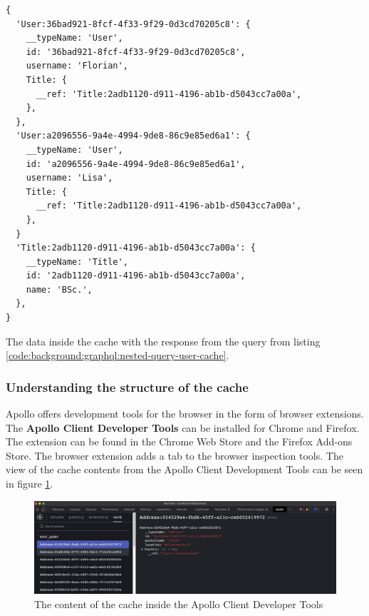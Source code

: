 \ifshowListings
\begin{listing}[H]
    \begin{verbatim}
{
  'User:36bad921-8fcf-4f33-9f29-0d3cd70205c8': {
    __typeName: 'User',
    id: '36bad921-8fcf-4f33-9f29-0d3cd70205c8',
    username: 'Florian',
    Title: {
      __ref: 'Title:2adb1120-d911-4196-ab1b-d5043cc7a00a',
    },
  },
  'User:a2096556-9a4e-4994-9de8-86c9e85ed6a1': {
    __typeName: 'User',
    id: 'a2096556-9a4e-4994-9de8-86c9e85ed6a1',
    username: 'Lisa',
    Title: {
      __ref: 'Title:2adb1120-d911-4196-ab1b-d5043cc7a00a',
    },
  }
  'Title:2adb1120-d911-4196-ab1b-d5043cc7a00a': {
    __typeName: 'Title',
    id: '2adb1120-d911-4196-ab1b-d5043cc7a00a',
    name: 'BSc.',
  },
}
    \end{verbatim}
    \caption{The data inside the cache with the response from the query from listing \ref{code:background:graphql:nested-query-user-cache}.}\label{code:background:graphql:nested-query-user-cache-representation}
\end{listing}
\fi

\subsubsection{Understanding the structure of the cache}\label{subsubsection:background:graphql:apollo-server-client:understanding-cache-structure}

Apollo offers development tools for the browser in the form of browser extensions. The \textbf{Apollo Client Developer Tools} can be installed for Chrome and Firefox. The extension can be found in the Chrome Web Store and the Firefox Add-ons Store. The browser extension adds a tab to the browser inspection tools. \cite{misc:-:background:graphql:apollo-developer-tools} The view of the cache contents from the Apollo Client Development Tools can be seen in figure \ref{fig:background:graphql:apollo:apollo-dev-tools}.

\ifshowImages
\begin{figure}[H]
    \centering
    \includegraphics[width=1\linewidth]{images/background/apollo/apollo-dev-tools.jpeg}
    \caption{The content of the cache inside the Apollo Client Developer Tools}\label{fig:background:graphql:apollo:apollo-dev-tools}
\end{figure}
\fi


